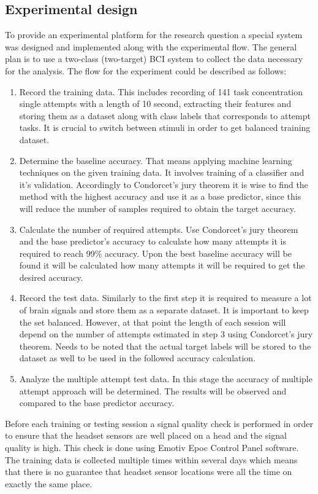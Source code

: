 \documentclass[12pt]{article}
\theoremstyle{definition}
\begin{document}
\subsection{Experimental design}
To provide an experimental platform for the research question a special system was designed and implemented along with the experimental flow. The general plan is to use a two-class (two-target) BCI system to collect the data necessary for the analysis. The flow for the experiment could be described as follows:
\begin{enumerate}
\item Record the training data. This includes recording of 141 task concentration single attempts with a length of 10 second, extracting their features and storing them as a dataset along with class labels that corresponds to attempt tasks. It is crucial to switch between stimuli in order to get balanced training dataset.
\item Determine the baseline accuracy. That means applying machine learning techniques on the given training data. It involves training of a classifier and it's validation. Accordingly to Condorcet's jury theorem it is wise to find the method with the highest accuracy and use it as a base predictor, since this will reduce the number of samples required to obtain the target accuracy. 
\item Calculate the number of required attempts. Use Condorcet's jury theorem and the base predictor's accuracy to calculate how many attempts it is required to reach 99\% accuracy.
Upon the best baseline accuracy will be found it will be calculated how many attempts it will be required to get the desired accuracy.
\item Record the test data. Similarly to the first step it is required to measure a lot of brain signals and store them as a separate dataset. It is important to keep the set balanced. However, at that point the length of each session will depend on the number of attempts estimated in step 3 using Condorcet's jury theorem. Needs to be noted that the actual target labels will be stored to the dataset as well to be used in the followed accuracy calculation.
\item Analyze the multiple attempt test data. In this stage the accuracy of multiple attempt approach will be determined. The results will be observed and compared to the base predictor accuracy.
\end{enumerate}

Before each training or testing session a signal quality check is performed in order to ensure that the headset sensors are well placed on a head and the signal quality is high. This check is done using Emotiv Epoc Control Panel software. The training data is collected multiple times within several days which means that there is no guarantee that headset sensor locations were all the time on exactly the same place. 
\end{document}
